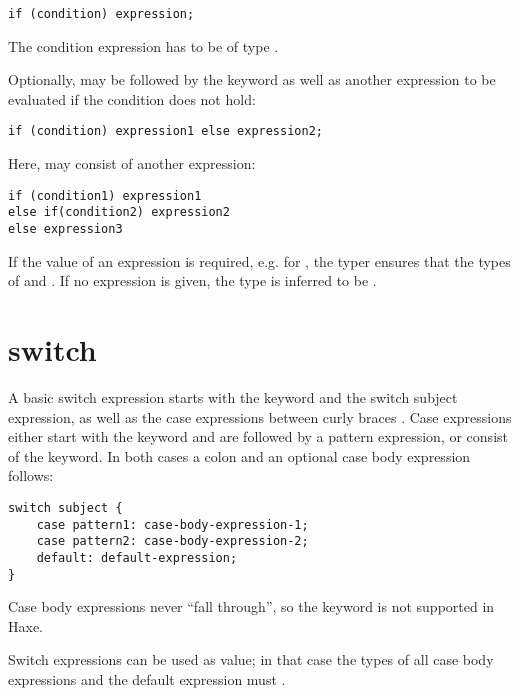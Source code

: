 \begin{lstlisting}
if (condition) expression;
\end{lstlisting}

The condition expression has to be of type .

Optionally,  may be followed by the  keyword as well as another expression to be evaluated if the condition does not hold:

\begin{lstlisting}
if (condition) expression1 else expression2;
\end{lstlisting}

Here,  may consist of another  expression:

\begin{lstlisting}
if (condition1) expression1
else if(condition2) expression2
else expression3
\end{lstlisting}

If the value of an  expression is required, e.g. for , the typer ensures that the types of  and  . If no  expression is given, the type is inferred to be .


\section{switch}
\label{expression-switch}

A basic switch expression starts with the  keyword and the switch subject expression, as well as the case expressions between curly braces \expr{\{\}}. Case expressions either start with the  keyword and are followed by a pattern expression, or consist of the  keyword. In both cases a colon \expr{:} and an optional case body expression follows:

\begin{lstlisting}
switch subject {
	case pattern1: case-body-expression-1;
	case pattern2: case-body-expression-2;
	default: default-expression;
}
\end{lstlisting}

Case body expressions never ``fall through'', so the  keyword is not supported in Haxe.

Switch expressions can be used as value; in that case the types of all case body expressions and the default expression must .

